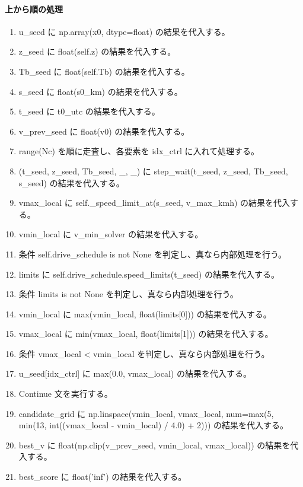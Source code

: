 \documentclass[a4paper,11pt]{article}
\begin{document}
            \paragraph{上から順の処理}
            \begin{enumerate}[leftmargin=1.8em]
            \item u\_seed に np.array(x0, dtype=float) の結果を代入する。
\item z\_seed に float(self.z) の結果を代入する。
\item Tb\_seed に float(self.Tb) の結果を代入する。
\item s\_seed に float(s0\_km) の結果を代入する。
\item t\_seed に t0\_utc の結果を代入する。
\item v\_prev\_seed に float(v0) の結果を代入する。
\item range(Nc) を順に走査し、各要素を idx\_ctrl に入れて処理する。
\item   (t\_seed, z\_seed, Tb\_seed, \_, \_) に step\_wait(t\_seed, z\_seed, Tb\_seed, s\_seed) の結果を代入する。
\item   vmax\_local に self.\_speed\_limit\_at(s\_seed, v\_max\_kmh) の結果を代入する。
\item   vmin\_local に v\_min\_solver の結果を代入する。
\item   条件 self.drive\_schedule is not None を判定し、真なら内部処理を行う。
\item     limits に self.drive\_schedule.speed\_limits(t\_seed) の結果を代入する。
\item     条件 limits is not None を判定し、真なら内部処理を行う。
\item       vmin\_local に max(vmin\_local, float(limits[0])) の結果を代入する。
\item       vmax\_local に min(vmax\_local, float(limits[1])) の結果を代入する。
\item   条件 vmax\_local < vmin\_local を判定し、真なら内部処理を行う。
\item     u\_seed[idx\_ctrl] に max(0.0, vmax\_local) の結果を代入する。
\item     Continue 文を実行する。
\item   candidate\_grid に np.linspace(vmin\_local, vmax\_local, num=max(5, min(13, int((vmax\_local - vmin\_local) / 4.0) + 2))) の結果を代入する。
\item   best\_v に float(np.clip(v\_prev\_seed, vmin\_local, vmax\_local)) の結果を代入する。
\item   best\_score に float('inf') の結果を代入する。

\end{enumerate}
\end{document}
